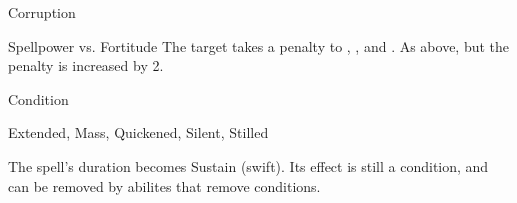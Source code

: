 \begin{spellsection}{Corruption}
\begin{spellheader}
\end{spellheader}
\begin{spellcontent}
\begin{spelltargetinginfo}
\end{spelltargetinginfo}
\begin{spelleffects}
\begin{spellattack}{Spellpower vs. Fortitude}
\spellsuccess
The target takes a  penalty to , , and .
\spellcritical
As above, but the penalty is increased by 2.
\end{spellattack}
\spelldur Condition
\end{spelleffects}
\end{spellcontent}
\begin{spellfooter}
 Extended, Mass, Quickened, Silent, Stilled
\end{spellfooter}
\begin{spellsubcontent}
\begin{spellcantrip}
The spell's duration becomes Sustain (swift).
Its effect is still a condition, and can be removed by abilites that remove conditions.
\end{spellcantrip}
\end{spellsubcontent}
\end{spellsection}

